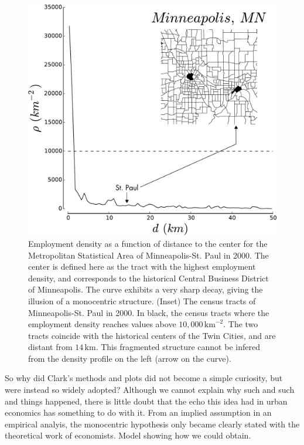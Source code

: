 \begin{figure}
    \centering
    \includegraphics[width=\textwidth]{./gfx/chapter-monocentric/distance_center_minneapolis.pdf}
    \caption{Employment density as a function of distance to the center for the
    Metropolitan Statistical Area of Minneapolis-St. Paul in 2000. The center is defined here as the
    tract with the highest employment density, and corresponds to the historical
    Central Business District of Minneapolis. The curve exhibits a very sharp
    decay, giving the illusion of a monocentric structure. (Inset) The census tracts
    of Minneapolis-St. Paul in 2000. In black, the census tracts where the
    employment density reaches values above $10,000\,\text{km}^{-2}$. The two tracts
    coincide with the historical centers of the Twin Cities, and are distant from
    $14\,\text{km}$. This fragmented structure cannot be infered from the density
    profile on the left (arrow on the curve).
    \label{fig:distance_center_Minneapolis}}
\end{figure}


So why did Clark's methods and plots did not become a simple curiosity, but were
instead so widely adopted? Although we cannot explain why such and such and
things happened, there is little doubt that the echo this idea had in urban
economics has something to do with it. From an implied assumption in an empirical analyis, the monocentric hypothesis
only became clearly stated with the theoretical work of
economists.\cite{Muth:1969} Model showing how we could obtain.




